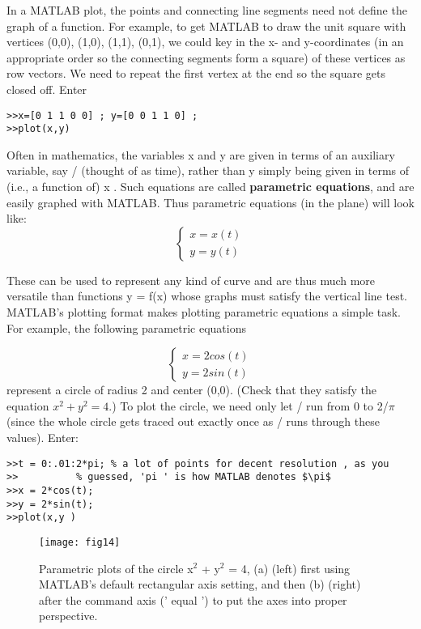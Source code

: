 \documentclass[../main.tex]{subfiles}
\begin{document}
In a MATLAB plot, the points and connecting line segments need not define the
graph of a function. For example, to get MATLAB to draw the unit square with
vertices (0,0), (1,0), (1,1), (0,1), we could key in the x- and y-coordinates (in an
appropriate order so the connecting segments form a square) of these vertices as
row vectors. We need to repeat the first vertex at the end so the square gets closed
off. Enter

\begin{verbatim}
>>x=[0 1 1 0 0] ; y=[0 0 1 1 0] ;
>>plot(x,y) 
\end{verbatim}

Often in mathematics, the variables x and y are given in terms of an auxiliary
variable, say / (thought of as time), rather than y simply being given in terms of
(i.e., a function of) x . Such equations are called \textbf{parametric equations}, and are easily graphed with MATLAB. Thus parametric equations (in the plane) will look like: 
\[\begin{cases}
    x = x(t)\\
    y = y(t) 
  \end{cases}
\]

These can be used to represent any kind of curve and are thus much more versatile
than functions y = f(x) whose graphs must satisfy the vertical line test.
MATLAB's plotting format makes plotting parametric equations a simple task.
For example, the following parametric equations

\[\begin{cases}
    x = 2cos(t)\\
    y = 2sin(t) 
  \end{cases}
\]
represent a circle of radius 2 and center (0,0). (Check that they satisfy the
equation $x^2  + y^2  = 4$.) To plot the circle, we need only let / run from 0 to 2/$\pi$
(since the whole circle gets traced out exactly once as / runs through these
values). Enter: 

\begin{verbatim}
>>t = 0:.01:2*pi; % a lot of points for decent resolution , as you 
>>			% guessed, 'pi ' is how MATLAB denotes $\pi$
>>x = 2*cos(t);
>>y = 2*sin(t);
>>plot(x,y )
\end{verbatim}


\begin{figure}[H]
\centering
\texttt{[image: fig14]}
\caption{Parametric plots of the circle x$^2$  + y$^2$  = 4, (a) (left) first using MATLAB's default rectangular axis setting, and then (b) (right) after the command axis (' equal ') to put the axes into proper perspective. }
\label{fig:fig_1_4}
\end{figure}
\end{document}

